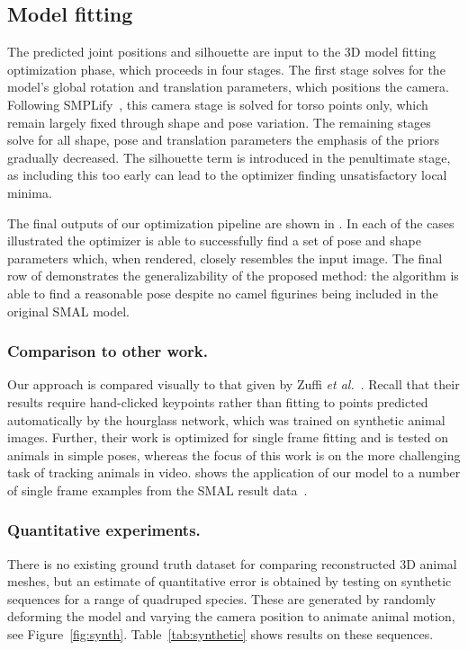 



\subsection{Model fitting}
The predicted joint positions and silhouette are input to the 3D model fitting optimization phase, which proceeds in four stages. The first stage solves for the model's global rotation and translation parameters, which positions the camera. Following SMPLify~\cite{bogo16keep}, this camera stage is solved for torso points only, which remain largely fixed through shape and pose variation. The remaining stages solve for all shape, pose and translation parameters the emphasis of the priors gradually decreased. The silhouette term is introduced in the penultimate stage, as including this too early can lead to the optimizer finding unsatisfactory local minima.

The final outputs of our optimization pipeline are shown in . In each of the cases illustrated the optimizer is able to successfully find a set of pose and shape parameters which, when rendered, closely resembles the input image. The final row of  demonstrates the generalizability of the proposed method: the algorithm is able to find a reasonable pose despite no camel figurines being included in the original SMAL model.

\subsubsection*{Comparison to other work.} Our approach is compared visually to that given by Zuffi {\em et al.}~\cite{zuffi2017menagerie}. Recall that their results require hand-clicked keypoints rather than fitting to points predicted automatically by the hourglass network, which was trained on synthetic animal images. Further, their work is optimized for single frame fitting and is tested on animals in simple poses, whereas the focus of this work is on the more challenging task of tracking animals in video.  shows the application of our model to a number of single frame examples from the SMAL result data~\cite{zuffi2017menagerie}.

\subsubsection*{Quantitative experiments.}
There is no existing ground truth dataset for comparing reconstructed 3D animal meshes, but an estimate of quantitative error is obtained by testing on synthetic sequences for a range of quadruped species. These are generated by randomly deforming the model and varying the camera position to animate animal motion, see Figure~\ref{fig:synth}. Table~\ref{tab:synthetic} shows results on these sequences. 

